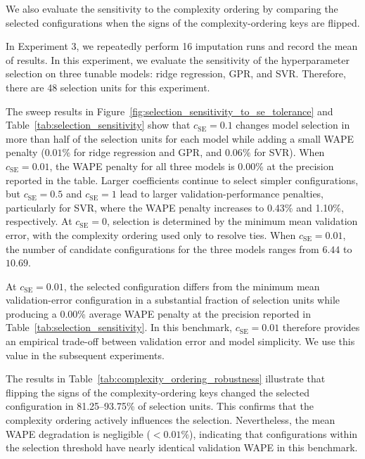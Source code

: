 We also evaluate the sensitivity to the complexity ordering by comparing the selected configurations when the signs of the complexity-ordering keys are flipped.

In Experiment 3, we repeatedly perform 16 imputation runs and record the mean of results. In this experiment, we evaluate the sensitivity of the hyperparameter selection on three tunable models: ridge regression, GPR, and SVR. Therefore, there are 48 selection units for this experiment.




The sweep results in Figure~\ref{fig:selection_sensitivity_to_se_tolerance} and Table~\ref{tab:selection_sensitivity} show that \(c_{\mathrm{SE}} = 0.1\) changes model selection in more than half of the selection units for each model while adding a small WAPE penalty (\(0.01\%\) for ridge regression and GPR, and \(0.06\%\) for SVR). When \(c_{\mathrm{SE}} = 0.01\), the WAPE penalty for all three models is 0.00\% at the precision reported in the table. Larger coefficients continue to select simpler configurations, but \(c_{\mathrm{SE}} = 0.5\) and \(c_{\mathrm{SE}} = 1\) lead to larger validation-performance penalties, particularly for SVR, where the WAPE penalty increases to 0.43\% and 1.10\%, respectively. At \(c_{\mathrm{SE}} = 0\), selection is determined by the minimum mean validation error, with the complexity ordering used only to resolve ties. When \(c_{\mathrm{SE}} = 0.01\), the number of candidate configurations for the three models ranges from \(6.44\) to \(10.69\).

At \(c_{\mathrm{SE}} = 0.01\), the selected configuration differs from the minimum mean validation-error configuration in a substantial fraction of selection units while producing a 0.00\% average WAPE penalty at the precision reported in Table~\ref{tab:selection_sensitivity}. In this benchmark, \(c_{\mathrm{SE}} = 0.01\) therefore provides an empirical trade-off between validation error and model simplicity. We use this value in the subsequent experiments.

% 



The results in Table~\ref{tab:complexity_ordering_robustness} illustrate that flipping the signs of the complexity-ordering keys changed the selected configuration in 81.25--93.75\% of selection units. This confirms that the complexity ordering actively influences the selection. Nevertheless, the mean WAPE degradation is negligible (\(<0.01\%\)), indicating that configurations within the selection threshold have nearly identical validation WAPE in this benchmark.


